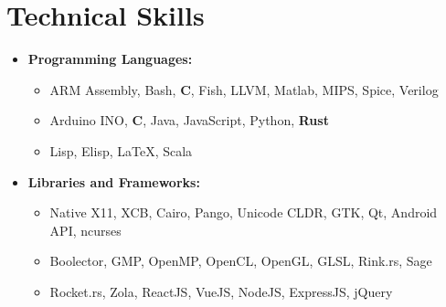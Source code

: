 \documentclass[10pt,letterpaper,sans]{moderncv}
\renewcommand{\_}{\textscale{.7}{\textunderscore}}
\newcommand{\Rplus}{\protect\hspace{-.1em}\protect\raisebox{.35ex}{\smaller{\smaller\textbf{+}}}}
\newcommand{\Cpp}{\mbox{C\Rplus\Rplus}\xspace}
\newcommand{\+}{%
  \raisebox{\dimexpr(\fontcharht\font`X-\height+\depth)/2\relax}{+}%
}
\begin{document}
\section{Technical Skills}
\begin{itemize}
\item \textbf{Programming Languages:}
  \begin{itemize}
  \item {} ARM Assembly, Bash, \textbf{C}, Fish, LLVM, Matlab, MIPS, Spice, Verilog
  \item {} Arduino INO, \textbf{\Cpp}, Java, JavaScript, Python, \textbf{Rust}
  \item {} Lisp, Elisp, \LaTeX, Scala
  \end{itemize}
\item \textbf{Libraries and Frameworks:} 
  \begin{itemize}
  \item {} Native X11, XCB, Cairo, Pango, Unicode CLDR,
    GTK, Qt, Android API, ncurses
  \item {} Boolector, GMP, OpenMP, OpenCL, OpenGL, GLSL, Rink.rs, Sage
  \item {} Rocket.rs, Zola, ReactJS, VueJS, NodeJS, ExpressJS, jQuery
  \end{itemize}
\end{itemize}
\end{document}

